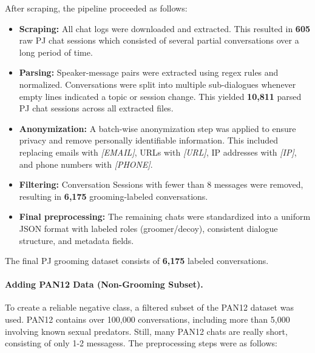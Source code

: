 After scraping, the pipeline proceeded as follows:
\begin{itemize}
    \item \textbf{Scraping:} All chat logs were downloaded and extracted. This resulted in \textbf{605} raw PJ chat sessions which consisted of several partial conversations over a long period of time.
    \item \textbf{Parsing:} Speaker-message pairs were extracted using regex rules and normalized. Conversations were split into multiple sub-dialogues whenever empty lines indicated a topic or session change. This yielded \textbf{10,811} parsed PJ chat sessions across all extracted files.
    \item \textbf{Anonymization:} A batch-wise anonymization step was applied to ensure privacy and remove personally identifiable information. This included replacing emails with \textit{[EMAIL]}, URLs with \textit{[URL]}, IP addresses with \textit{[IP]}, and phone numbers with \textit{[PHONE]}.
    \item \textbf{Filtering:} Conversation Sessions with fewer than 8 messages were removed, resulting in \textbf{6,175} grooming-labeled conversations.
    \item \textbf{Final preprocessing:} The remaining chats were standardized into a uniform JSON format with labeled roles (groomer/decoy), consistent dialogue structure, and metadata fields.
\end{itemize}

The final PJ grooming dataset consists of \textbf{6,175} labeled conversations.

\paragraph{Adding PAN12 Data (Non-Grooming Subset).}
To create a reliable negative class, a filtered subset of the PAN12 dataset was used. PAN12 contains over 100{,}000 conversations, including more than 5{,}000 involving known sexual predators. Still, many PAN12 chats are really short, consisting of only 1-2 messagess. The preprocessing steps were as follows:

